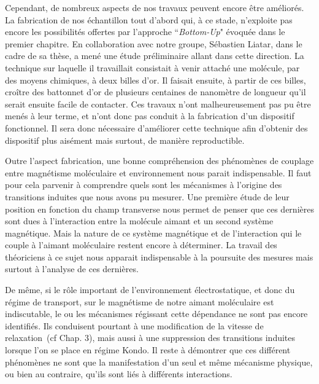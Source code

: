 Cependant, de nombreux aspects de nos travaux peuvent encore être améliorés. La fabrication de nos échantillon tout d'abord qui, à ce stade, n'exploite pas encore les possibilités offertes par l'approche ``\textit{Bottom-Up}" évoquée dans le premier chapitre. En collaboration avec notre groupe, Sébastien Liatar, dans le cadre de sa thèse, a mené une étude préliminaire allant dans cette direction. La technique sur laquelle il travaillait consistait à venir attaché une molécule, par des moyens chimiques, à deux billes d'or. Il faisait ensuite, à partir de ces billes, croître des battonnet d'or de plusieurs centaines de nanomètre de longueur qu'il serait ensuite facile de contacter. Ces travaux n'ont malheureusement pas pu être menés à leur terme, et n'ont donc pas conduit à la fabrication d'un dispositif fonctionnel. Il sera donc nécessaire d'améliorer cette technique afin d'obtenir des dispositif plus aisément mais surtout, de manière reproductible.

Outre l'aspect fabrication, une bonne compréhension des phénomènes de couplage entre magnétisme moléculaire et environnement nous parait indispensable. Il faut pour cela parvenir à comprendre quels sont les mécanismes à l'origine des transitions induites que nous avons pu mesurer. Une première étude de leur position en fonction du champ transverse nous permet de penser que ces dernières sont dues à l'interaction entre la molécule aimant et un second système magnétique. Mais la nature de ce système magnétique et de l’interaction qui le couple à l'aimant moléculaire restent encore à déterminer. La travail des théoriciens à ce sujet nous apparait indispensable à la poursuite des mesures mais surtout à l'analyse de ces dernières.

De même, si le rôle important de l'environnement électrostatique, et donc du régime de transport, sur le magnétisme de notre aimant moléculaire est indiscutable, le ou les mécanismes régissant cette dépendance ne sont pas encore identifiés. Ils conduisent pourtant à une modification de la vitesse de relaxation~(cf Chap. 3), mais aussi à une suppression des transitions induites lorsque l'on se place en régime Kondo. Il reste à démontrer que ces différent phénomènes ne sont que la manifestation d'un seul et m\^eme mécanisme physique, ou bien au contraire, qu'ils sont liés à différents interactions.